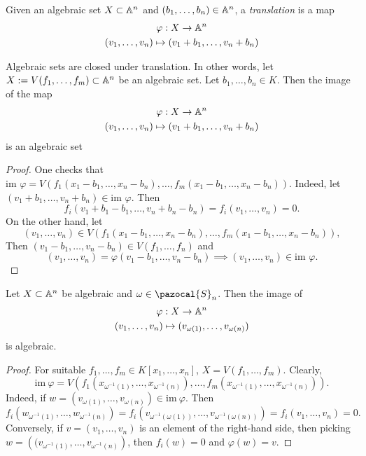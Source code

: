 \begin{definition}
    Given an algebraic set $X\subset \mathbb{A}^n$ and $(b_1,\dots,b_n)\in\mathbb{A}^n$, a \textit{translation} is a map 
    \begin{gather*}
        \varphi: X \rightarrow \mathbb{A}^n\\ (v_1,\dots,v_n)\mapsto (v_1+b_1,\dots,v_n+b_n)
    \end{gather*}
\end{definition}
\begin{lemma}\label{AlgebraicSetsAreCloseUnderTranslation}
    Algebraic sets are closed under translation. In other words, let $X:=V(f_1,\dots,f_m)\subset \mathbb{A}^n$ be an algebraic set. Let $b_1,\dots,b_n\in K$. Then the image of the map 
    \begin{gather*}
        \varphi : X \rightarrow \mathbb{A}^n\\
        (v_1,\dots,v_n)\mapsto (v_1+b_1, \dots, v_n+b_n)
    \end{gather*}
    is an algebraic set
\end{lemma}
\begin{proof}
    One checks that $\text{im } \varphi = V(f_1(x_1-b_1,\dots, x_n-b_n),\dots,f_m(x_1-b_1,\dots, x_n-b_n))$. Indeed, let 
    $(v_1+b_1,\dots,v_n+b_n)\in \text{im } \varphi$. Then 
    $$f_i(v_1+b_1-b_1,\dots,v_n+b_n-b_n)=f_i(v_1,\dots,v_n) = 0.$$
    On the other hand, let 
    $$(v_1,\dots,v_n) \in V(f_1(x_1-b_1,\dots, x_n-b_n),\dots,f_m(x_1-b_1,\dots, x_n-b_n)),$$
    Then $(v_1-b_1,\dots,v_n-b_n)\in V(f_1,\dots,f_n)$ and 
    $$(v_1,\dots,v_n) = \varphi(v_1-b_1,\dots,v_n-b_n) \implies (v_1,\dots,v_n)\in \text{im }\varphi.$$
\end{proof}
\begin{lemma}\label{AlgebraicSetsAreClosedUnderPermutation}
    Let $X\subset \mathbb{A}^n$ be algebraic and $\omega\in \pazocal{S}_n$. Then the image of 
    \begin{gather*}
        \varphi: X\rightarrow \mathbb{A}^n\\
        (v_1,\dots,v_n)\mapsto (v_{\omega(1)},\dots,v_{\omega(n)})
    \end{gather*}
    is algebraic.
\end{lemma}
\begin{proof}
    For suitable $f_1,\dots,f_m\in K[x_1,\dots,x_n]$, $X=V(f_1,\dots,f_m)$. Clearly, 
    $$\mathrm{im}\ \varphi = V\left(f_1\left(x_{\omega^{-1}(1)},\dots,x_{\omega^{-1}(n)}\right),\dots,f_m\left(x_{\omega^{-1}(1)},\dots,x_{\omega^{-1}(n)}\right)\right).$$
    Indeed, if $w=(v_{\omega(1)},\dots,v_{\omega(n)})\in \mathrm{im}\ \varphi$. Then 
    $$f_i\left(w_{\omega^{-1}(1)},\dots,w_{\omega^{-1}(n)}\right)=f_i\left(v_{\omega^{-1}(\omega(1))},\dots,v_{\omega^{-1}(\omega(n))}\right)=f_i(v_1,\dots,v_n)=0.$$
    Conversely, if $v=(v_1,\dots,v_n)$ is an element of the right-hand side, then picking $w=\left((v_{\omega^{-1}(1)},\dots,v_{\omega^{-1}(n)} \right)$, then $f_i(w)=0$ and $\varphi(w)=v$.
\end{proof}
